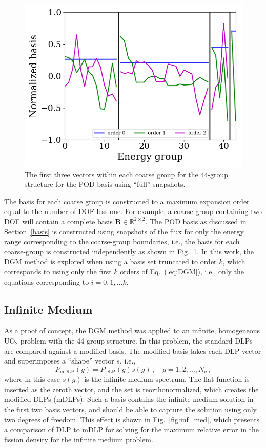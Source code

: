 \documentclass[5p,times,twocolumn,10pt]{elsarticle}
\newcommand{\EQ}[1]{Eq.~(\ref{#1})}               %
\newcommand{\FIG}[1]{Fig.~\ref{#1}}               %
\newcommand{\SEC}[1]{Section~\ref{#1}}               %
\newcommand{\mat}[1]{\ensuremath{\bm{#1}}}
\begin{document}
    \begin{figure}[htb]
        \includegraphics[scale=0.55]{figures/44_full}
        \caption{The first three vectors within each coarse group for the 44-group structure for the POD basis using ``full'' snapshots.}
        \label{fig:basis}
    \end{figure}

    The basis for each coarse group is constructed to a maximum expansion order equal to the number of DOF less one.
    For example, a coarse-group containing two DOF will contain a complete basis $\mat{B}\in\mathbb{R}^{2\times2}$.
    The POD basis as discussed in \SEC{basis} is constructed using snapshots of the flux for only the energy range corresponding to the coarse-group boundaries, i.e., the basis for each coarse-group is constructed independently as shown in \FIG{fig:basis}.
    In this work, the DGM method is explored when using a basis set truncated to order $k$, which corresponds to using only the first $k$ orders of \EQ{eq:DGM}, i.e., only the equations corresponding to $i = 0, 1, \ldots k$.

    \subsection{Infinite Medium}
    As a proof of concept, the DGM method was applied to an infinite, homogeneous UO$_2$ problem with the 44-group structure.
    In this problem, the standard DLPs are compared against a modified basis.
    The modified basis takes each DLP vector and superimposes a ``shape'' vector $s$, i.e.,
    \begin{equation}
        P_{\text{mDLP}}(g) = P_{\text{DLP}}(g)s(g)\, ,\quad g=1, 2, \ldots, N_g\, ,
    \end{equation}
    where in this case $s(g)$ is the infinite medium spectrum.
    The flat function is inserted as the zeroth vector, and the set is reorthonormalized, which creates the modified DLPs (mDLPs).
    Such a basis contains the infinite medium solution in the first two basis vectors, and should be able to capture the solution using only two degrees of freedom.
    This effect is shown in \FIG{fig:inf_med}, which presents a comparison of DLP to mDLP for solving for the maximum relative error in the fission density for the infinite medium problem.
\end{document}
